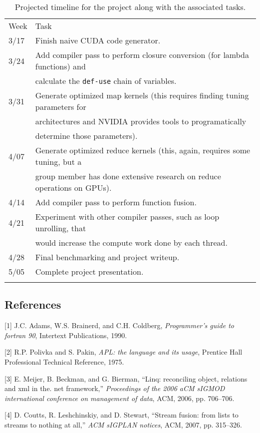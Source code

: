 \begin{longtable}[c]{@{}ll@{}}
\hline\noalign{\medskip}
Week & Task
\\\noalign{\medskip}
\hline\noalign{\medskip}
3/17 & Finish naive CUDA code generator.
\\\noalign{\medskip}
3/24 & Add compiler pass to perform closure conversion (for lambda
functions) and
\\\noalign{\medskip}
& calculate the \texttt{def-use} chain of variables.
\\\noalign{\medskip}
3/31 & Generate optimized map kernels (this requires finding tuning
parameters for
\\\noalign{\medskip}
& architectures and NVIDIA provides tools to programatically
\\\noalign{\medskip}
& determine those parameters).
\\\noalign{\medskip}
4/07 & Generate optimized reduce kernels (this, again, requires some
tuning, but a
\\\noalign{\medskip}
& group member has done extensive research on reduce operations on
GPUs).
\\\noalign{\medskip}
4/14 & Add compiler pass to perform function fusion.
\\\noalign{\medskip}
4/21 & Experiment with other compiler passes, such as loop unrolling,
that
\\\noalign{\medskip}
& would increase the compute work done by each thread.
\\\noalign{\medskip}
4/28 & Final benchmarking and project writeup.
\\\noalign{\medskip}
5/05 & Complete project presentation.
\\\noalign{\medskip}
\hline
\noalign{\medskip}
\caption{Projected timeline for the project along with the associated
tasks.}
\end{longtable}

\subsection{References}\label{references}

{[}1{]} J.C. Adams, W.S. Brainerd, and C.H. Coldberg, \emph{Programmer's
guide to fortran 90}, Intertext Publications, 1990.

{[}2{]} R.P. Polivka and S. Pakin, \emph{APL: the language and its
usage}, Prentice Hall Professional Technical Reference, 1975.

{[}3{]} E. Meijer, B. Beckman, and G. Bierman, ``Linq: reconciling
object, relations and xml in the. net framework,'' \emph{Proceedings of
the 2006 aCM sIGMOD international conference on management of data},
ACM, 2006, pp. 706--706.

{[}4{]} D. Coutts, R. Leshchinskiy, and D. Stewart, ``Stream fusion:
from lists to streams to nothing at all,'' \emph{ACM sIGPLAN notices},
ACM, 2007, pp. 315--326.

